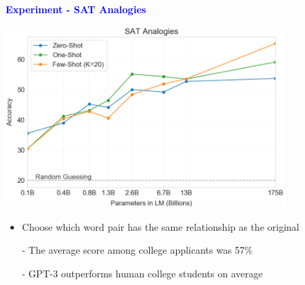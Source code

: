 \documentclass[professionalfont]{beamer}
\begin{document}
\begin{frame}

\begin{center}
    { \textbf{\textcolor{blue}{ {\fontsize{12}{14}\selectfont Experiment - SAT Analogies} }} }
\end{center}

\begin{center}
    \includegraphics[width=0.8\textwidth]{figure/3-12.png}
\end{center}

{\fontsize{10}{14}\selectfont 
\begin{itemize}
    \item Choose which word pair has the same relationship as the original

    - The average score among college applicants was 57\%

    - GPT-3 outperforms human college students on average

\end{itemize}
}

\end{frame}
\end{document}
